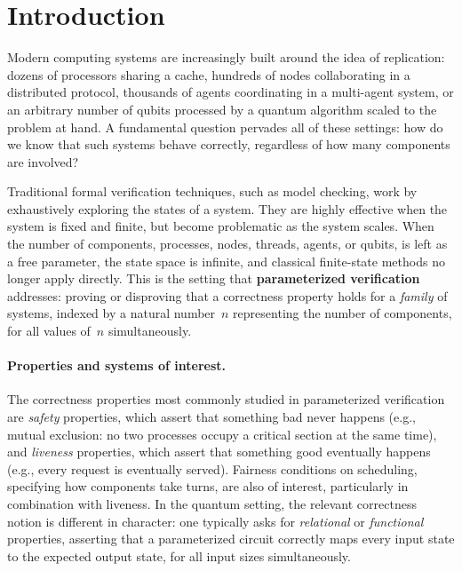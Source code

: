 \section{Introduction}

Modern computing systems are increasingly built around the idea of replication:
dozens of processors sharing a cache, hundreds of nodes collaborating in a
distributed protocol, thousands of agents coordinating in a multi-agent system,
or an arbitrary number of qubits processed by a quantum algorithm scaled to
the problem at hand. A fundamental question pervades all of these settings:
how do we know that such systems behave correctly, regardless of how many
components are involved?

Traditional formal verification techniques, such as model checking, work by
exhaustively exploring the states of a system. They are highly effective when
the system is fixed and finite, but become problematic as the system scales.
When the number of components, processes, nodes, threads, agents, or qubits,
is left as a free parameter, the state space is infinite, and classical
finite-state methods no longer apply directly. This is the setting that
\textbf{parameterized verification} addresses: proving or disproving that a
correctness property holds for a \emph{family} of systems, indexed by a
natural number~$n$ representing the number of components, for all values of~$n$
simultaneously.

\paragraph{Properties and systems of interest.}
The correctness properties most commonly studied in parameterized verification
are \emph{safety} properties, which assert that something bad never happens
(e.g., mutual exclusion: no two processes occupy a critical section at the
same time), and \emph{liveness} properties, which assert that something good
eventually happens (e.g., every request is eventually served). Fairness
conditions on scheduling, specifying how components take turns, are also
of interest, particularly in combination with liveness. In the quantum setting,
the relevant correctness notion is different in character: one typically asks
for \emph{relational} or \emph{functional} properties, asserting that a
parameterized circuit correctly maps every input state to the expected output
state, for all input sizes simultaneously.

